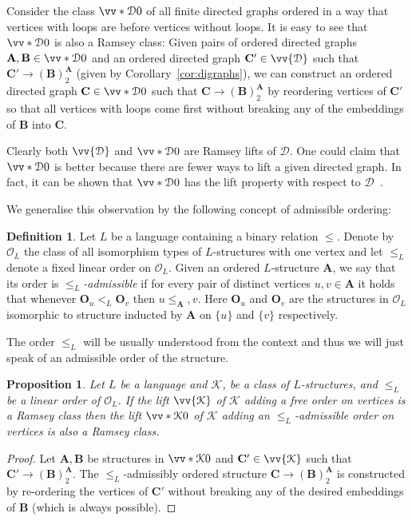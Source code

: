 \documentclass{elsarticle}
\def\ordclass#1{\vv{#1}}
\def\ordclasssup#1#2{\vv*{#1}{#2}}
\def\str#1{\mathbf {#1}}
\def\K{{\mathcal K}}
\theoremstyle{plain}
\newtheorem{prop}[theorem]{Proposition}
\theoremstyle{definition}
\newtheorem{definition}[theorem]{Definition}
\theoremstyle{remark}
\begin{document}
Consider the class
$\ordclasssup{\mathcal D}{0}$ of all finite directed graphs ordered in a way that
vertices with loops are before vertices without loops.
It is easy to see that $\ordclasssup{\mathcal {D}}{0}$ is also a Ramsey class: Given pairs of
ordered directed graphs $\str{A},\str{B}\in \ordclasssup{\mathcal {D}}{0}$ and an ordered directed graph $\str{C}'\in \ordclass{\mathcal {D}}$
such that $\str{C}'\longrightarrow (\str{B})^\str{A}_2$ (given by Corollary~\ref{cor:digraphs}), we can construct an ordered directed graph
$\str{C}\in \ordclasssup{\mathcal {D}}{0}$ such that $\str{C}\longrightarrow (\str{B})^\str{A}_2$ by reordering vertices of $\str{C}'$
so that all vertices with loops come first without breaking any of the embeddings of $\str{B}$ into $\str{C}$.

Clearly both $\ordclass{\mathcal{D}}$ and $\ordclasssup{\mathcal{D}}{0}$
are Ramsey lifts of $\mathcal D$. One could claim that $\ordclasssup{\mathcal {D}}{0}$ is better
because there are fewer ways to lift a given directed graph. In fact,
it can be shown that $\ordclasssup{\mathcal{D}}{0}$ has the lift property with respect to
$\mathcal {D}$~\cite{Jasinski2013}.

We generalise this observation by the following concept of admissible ordering:
\begin{definition}
Let $L$ be a language containing a binary relation $\leq$. Denote by $\mathcal O_L$ the class of all isomorphism types of $L$-structures with one vertex
and let $\leq_L$ denote a fixed linear order on $\mathcal O_L$.
 Given  an ordered $L$-structure $\str A$, we say that its order is \emph{$\leq_L$-admissible} if for every pair of distinct vertices $u,v\in \str{A}$ it holds that whenever $\str{O}_u<_L\str{O}_v$ then $u \leq_\str{A},v$.
Here $\str{O}_u$ and $\str{O}_v$ are the structures in $\mathcal O_L$ isomorphic to structure inducted by $\str{A}$ on $\{u\}$ and $\{v\}$ respectively.
\end{definition}
The order $\leq_L$ will be usually understood from the context and thus we will just speak of an admissible order of the structure.
\begin{prop}
\label{prop:admisible}
Let $L$ be a language and $\K$, be a class of $L$-structures, and $\leq_L$ be a linear order of $\mathcal O_L$. If the lift $\ordclass \K$ of $\K$ adding a free order on vertices is
a Ramsey class then the lift $\ordclasssup \K{0}$ of $\K$ adding an $\leq_L$-admissible order on vertices is also a Ramsey class.
\end{prop}
\begin{proof}
Let $\str{A}, \str{B}$ be structures in $\ordclasssup \K{0}$ and $\str{C}'\in \ordclass \K$ such that $\str{C}'\longrightarrow(\str{B})^\str{A}_2$.
The $\leq_L$-admissibly ordered structure $\str{C}\longrightarrow(\str{B})^\str{A}_2$ is constructed by re-ordering the vertices of $\str{C}'$ without breaking any of the desired
embeddings of $\str{B}$ (which is always possible).
\end{proof}
\end{document}
